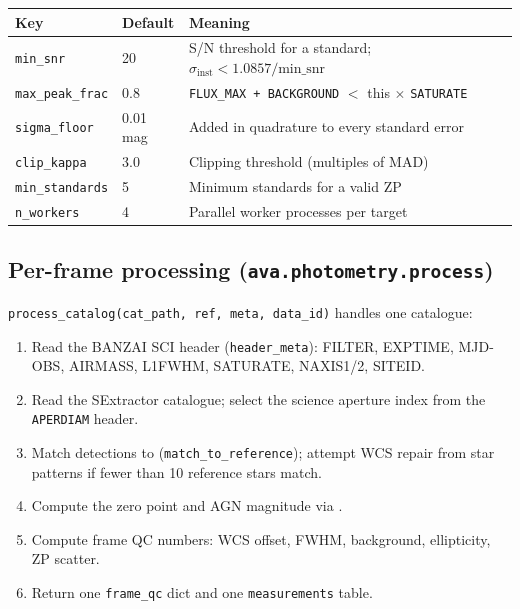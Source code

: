 \documentclass[12pt,a4paper]{article}
\begin{document}
\begin{center}
\small
\begin{tabular}{lll}
\toprule
Key & Default & Meaning \\
\midrule
\texttt{min\_snr}       & 20 & S/N threshold for a standard; $\sigma_\mathrm{inst} < 1.0857 / \mathrm{min\_snr}$ \\
\texttt{max\_peak\_frac}& 0.8 & \texttt{FLUX\_\hspace{0pt}MAX + BACKGROUND} $<$ this $\times$ \texttt{SATURATE} \\
\texttt{sigma\_floor}  & 0.01\,mag & Added in quadrature to every standard error \\
\texttt{clip\_kappa}   & 3.0 & Clipping threshold (multiples of MAD) \\
\texttt{min\_standards}& 5   & Minimum standards for a valid ZP \\
\texttt{n\_workers}    & 4   & Parallel worker processes per target \\
\bottomrule
\end{tabular}
\end{center}

\subsection{Per-frame processing (\texorpdfstring{\texttt{ava.photometry.process}}{ava.photometry.process})}

\texttt{process\_\hspace{0pt}catalog(cat\_\hspace{0pt}path, ref, meta, data\_\hspace{0pt}id)} handles one catalogue:

\begin{enumerate}
  \item Read the BANZAI SCI header (\texttt{header\_meta}): FILTER, EXPTIME,
        MJD-OBS, AIRMASS, L1FWHM, SATURATE, NAXIS1/2, SITEID.
  \item Read the SExtractor catalogue; select the science aperture index from
        the \texttt{APERDIAM} header.
  \item Match detections to  (\texttt{match\_\hspace{0pt}to\_\hspace{0pt}reference});
        attempt WCS repair from star patterns if fewer than 10 reference stars match.
  \item Compute the zero point and AGN magnitude via .
  \item Compute frame QC numbers: WCS offset, FWHM, background, ellipticity, ZP scatter.
  \item Return one \texttt{frame\_qc} dict and one \texttt{measurements} table.
\end{enumerate}
\end{document}
